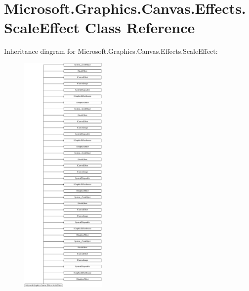 \hypertarget{class_microsoft_1_1_graphics_1_1_canvas_1_1_effects_1_1_scale_effect}{}\section{Microsoft.\+Graphics.\+Canvas.\+Effects.\+Scale\+Effect Class Reference}
\label{class_microsoft_1_1_graphics_1_1_canvas_1_1_effects_1_1_scale_effect}
Inheritance diagram for Microsoft.\+Graphics.\+Canvas.\+Effects.\+Scale\+Effect\+:\begin{figure}[H]
\begin{center}
\leavevmode
\includegraphics[height=12.000000cm]{class_microsoft_1_1_graphics_1_1_canvas_1_1_effects_1_1_scale_effect}
\end{center}
\end{figure}
